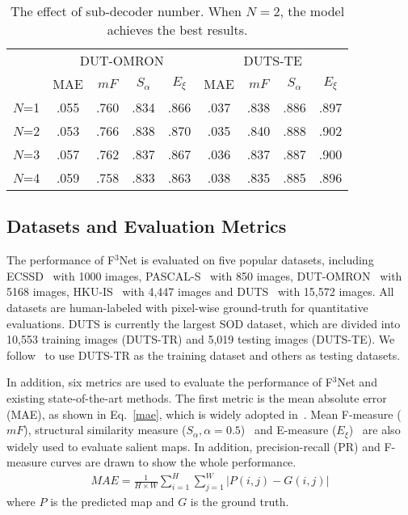 \documentclass[letterpaper]{article} %
\begin{document}
\begin{table}[htb]
  \label{iteration}
  \renewcommand\tabcolsep{3.7pt}
  \renewcommand\arraystretch{1.1}
  \begin{tabular}{c|cccc|cccc}
    \hline
     & \multicolumn{4}{c|}{DUT-OMRON} & \multicolumn{4}{c}{DUTS-TE} \\
     & MAE & $mF$ & $S_\alpha$ & $E_\xi$ & MAE & $mF$ & $S_\alpha$ & $E_\xi$ \\
    \hline
    $N$=1 & .055 & .760 & .834 & .866 & .037 & .838 & .886 & .897 \\
    $N$=2 & .053 & .766 & .838 & .870 & .035 & .840 & .888 & .902 \\
    $N$=3 & .057 & .762 & .837 & .867 & .036 & .837 & .887 & .900 \\
    $N$=4 & .059 & .758 & .833 & .863 & .038 & .835 & .885 & .896 \\
    \hline
  \end{tabular}
  \caption{The effect of sub-decoder number. When $N=2$, the model achieves the best results.}
\end{table}


\subsection{Datasets and Evaluation Metrics}
The performance of F$^3$Net is evaluated on five popular datasets, including ECSSD~\cite{ECSSD} with 1000 images, PASCAL-S~\cite{PASCALS} with 850 images, DUT-OMRON~\cite{DUTO} with 5168 images, HKU-IS~\cite{HKUIS} with 4,447 images and  DUTS~\cite{DUTS} with 15,572 images. All datasets are human-labeled with pixel-wise ground-truth for quantitative evaluations. DUTS is currently the largest SOD dataset, which are divided into 10,553 training images (DUTS-TR) and 5,019 testing images (DUTS-TE). We follow~\cite{CPD,BASNet} to use DUTS-TR as the training dataset and others as testing datasets. 

In addition, six metrics are used to evaluate the performance of F$^3$Net and existing state-of-the-art methods. The first metric is the mean absolute error (MAE), as shown in Eq.~\ref{mae}, which is widely adopted in~\cite{DSS,PiCANet}. Mean F-measure ($mF$), structural similarity measure ($S_\alpha, \alpha = 0.5$)~\cite{Smeasure} and E-measure ($E_\xi$)~\cite{Emeasure} are also widely used to evaluate salient maps. In addition, precision-recall (PR) and F-measure curves are drawn to show the whole performance.
\begin{eqnarray}
  MAE = \frac{1}{H \times W} \sum_{i=1}^{H}\sum_{j=1}^{W}|P(i,j)-G(i,j)|
  \label{mae}
\end{eqnarray}
where $P$ is the predicted map and $G$ is the ground truth.
\end{document}
